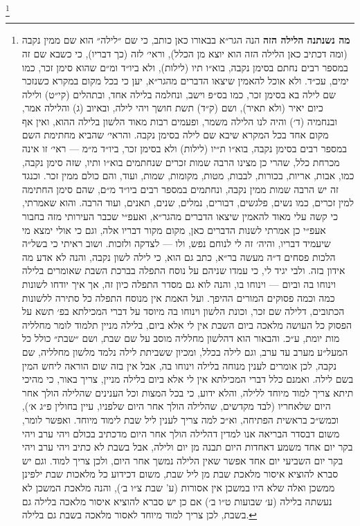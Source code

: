 \documentclass[12pt, openany]{book}
\newcommand{\footnotecomment}[1]{
	\renewcommand\thefootnote{}
	\footnote{\textsf{#1}}}
\newcommand{\commenta}[1]{\footnotecomment{#1}\hspace{0em}}
\begin{document}
\commenta{\textrm{\textbf{מה נשנתנה הלילה הזה}} הנה הגר״א בבאורו כאן כותב, כי שם ״לילה״ הוא שם ממין נקבה (ומה  דכתיב כאן הלילה הזה הוא יוצא מן הכלל), וראי׳ לזה (כך דבריו), כי כשבא שם זה במספר רבים נחתם בסימן נקבה, בוא״ו תיו (לילות), ולא ביו״ד ומ״ם שהוא סימן זכר, כמו ימים, עכ״ד. ולא אוכל להאמין שיצאו הדברים מהגר״א, יען כי בכל מקום במקרא  כשנזכר שם לילה בא בסימן זכר, כמו בס״פ וישב, ונחלמה בלילה אחד, ובתהלים (קי״ט) ולילה כיום יאיר (ולא תאיר), ושם (ק״ד) תשת חושך ויהי לילה, ובאיוב (ג) והלילה אמר, ובנחמיה (ד׳) והיה לנו הלילה משמר, ופעמים רבות מאוד הלשון בלילה ההוא, ואין אף מקום אחד בכל המקרא שיבא שם לילה  בסימן נקבה. והראי׳ שהביא מחתימת השם במספר רבים בסימן נקבה, בוא״ו ת״יו (לילות) ולא בסימן זכר, ביו״ד מ״מ — ראי׳ זו אינה מכרחת כלל, שהרי כן מצינו הרבה שמות זכרים שנחתמים בוא״ו ותיו, שזה סימן נקבה, כמו, אבות, אריות, בכורות, לבבות, מטות, מקומות, שמות, ועוד, והם כולם ממין זכר. וכנגד זה יש הרבה שמות ממין נקבה, ונחתמים במספר רבים ביו״ד מ״ם, שהם סימן החתימה למין זכרים, כמו נשים, פלגשים, דבורים, נמלים, שנים, תאנים, ועוד הרבה. והוא שאמרתי, כי קשה עלי מאוד להאמין שיצאו הדברים מהגר״א, ואעפ״י שכבר העירותי מזה בחבור אעפ״י כן אמרתי לשנות הדברים כאן, מקום מקור דבריו אלה, וגם כי אולי ימצא מי שיעמיד דבריו, והיה׳ זה לי לנוחם נפש, ולו — לצדקה ולזכות. ושוב ראיתי כי בשל״ה הלכות פסחים ד״ה מעשה בר״א, כתב גם הוא, כי לילה לשון נקבה, והנה לא אדע מה אידון בזה. ולבי יגיד לי, כי עמדו שניהם על נוסח התפלה בברכת השבת שאומרים בלילה וינוחו בה וביום — וינוחו בו, והנה לוא גם מסדר התפלה כיון זה, אך איך יודחו לשונות כמה וכמה פסוקים המורים ההיפך. ועל האמת אין מנוסח התפלה כל סתירה ללשונות הכתובים, דלילה שם זכר, וכונת הלשון וינוחו בה מיוסד על דברי המכילתא בפ׳ תשא על הפסוק כל העושה מלאכה ביום השבת אין לי אלא ביום, בלילה מניין תלמוד לומר מחלליה מות יומת, ע״כ. והבאור הוא דהלשון מחלליה מוסב על שם שבת, ושם  ״שבת״ כולל כל המעל״ע מערב עד ערב, וגם לילה בכלל, ומכיון ששביתת לילה נלמד מלשון מחלליה, שם נקבה, לכן אומרים לענין מנוחה בלילה וינוחו בה, אבל אין בזה שום הוראה ליחש המין בשם לילה. ואמנם כלל דברי המכילתא אין לי אלא ביום בלילה מניין, צריך באור, כי מהיכי תיתא צריך למוד מיוחד ללילה, והלא ידוע, כי בכל המצות וכל הענינים שהלילה הולך אחר היום שלאחריו (לבד מקדשים, שהלילה הולך אחר היום שלפניו, עיין בחולין פ״ג א׳), וכמש״כ בראשית הפתיחה, וא״כ למה צריך לענין ליל שבת לימוד מיוחד. ואפשר לומר, משום דבסדר הבריאה אנו למדין דהלילה הולך אחר היום מדכתיב בכולם ויהי ערב ויהי בקר יום אחד משמע דאחדות היום תבנה מן יום ולילה, אבל בשבת לא כתיב ויהי ערב ויהי בקר יום השביעי יום אחד אפשר שאין הלילה נמשך אחר היום, ולכן צריך למוד. וגם יש סברא להוציא איסור מלאכת שבת מן ליל שבת, משום דכידוע כל מלאכות שבת ילפינן ממשכן ואלה שלא היו במשכן אין אסורות (ע' שבת צ״ו ב׳), והנה מלאכת המשכן לא נעשתה בלילה (ע׳ שבועות ט״ו ב׳) אם כן יש סברא להוציא איסור מלאכה בלילה גם בשבת, לכן צריך למוד מיוחד לאסור מלאכה בשבת גם בלילה.}%
\end{document}
